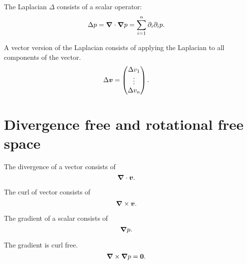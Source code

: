 \begin{definition}[Laplacian]
The Laplacian $\Delta$ consists of a scalar operator:
\begin{equation}
\Delta p={\boldsymbol {\nabla}}\cdot {\boldsymbol {\nabla}}p=\sum_{i=1}^{n} \partial_{i}\partial_{i}p.
\end{equation}
\end{definition}

\begin{definition}
A vector version of the Laplacian consists of applying the Laplacian to all components of the vector.
\begin{equation}
 \Delta {\boldsymbol {v}}=\begin{pmatrix} \Delta v_{1}\\
                  \vdots\\ \Delta v_{n}
                 \end{pmatrix}.
\end{equation}
\end{definition}
\section{Divergence free and rotational free space}

\begin{definition}[Divergence]
 The divergence of a vector consists of
 \begin{equation}
  {\boldsymbol {\nabla}} \cdot {\boldsymbol {v}}.
  \end{equation}
\end{definition}

\begin{definition}[Curl]
 The curl of vector consists of
 \begin{equation}
  {\boldsymbol {\nabla}} \times {\boldsymbol {v}}.
 \end{equation}
\end{definition}

\begin{definition}[Gradient]
 The gradient of a scalar consists of
 \begin{equation}
  {\boldsymbol {\nabla}} p.
 \end{equation}
\end{definition}

\begin{property}
 The gradient is curl free.
 \begin{equation}
  {\boldsymbol {\nabla}}\times {\boldsymbol {\nabla}} p={\boldsymbol {0}}.
 \end{equation}
\end{property}

